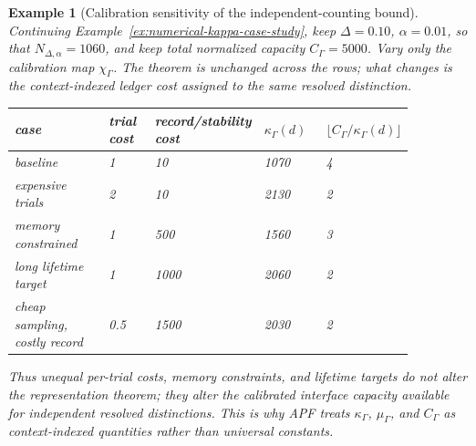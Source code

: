 \documentclass[11pt]{article}
\newtheorem{example}[theorem]{Example}
\begin{document}
\begin{example}[Calibration sensitivity of the independent-counting bound]\label{ex:kappa-sensitivity}
Continuing Example~\ref{ex:numerical-kappa-case-study}, keep \(\Delta=0.10\), \(\alpha=0.01\), so that \(N_{\Delta,\alpha}=1060\), and keep total normalized capacity \(C_\Gamma=5000\).  Vary only the calibration map \(\chi_\Gamma\).  The theorem is unchanged across the rows; what changes is the context-indexed ledger cost assigned to the same resolved distinction.
\begin{center}
\small
\setlength{\tabcolsep}{3pt}
\renewcommand{\arraystretch}{1.15}
\begin{tabular}{@{}p{0.25\linewidth}p{0.12\linewidth}p{0.20\linewidth}p{0.16\linewidth}p{0.14\linewidth}@{}}
\toprule
case & trial cost & record/stability cost & $\kappa_\Gamma(d)$ & $\lfloor C_\Gamma/\kappa_\Gamma(d)\rfloor$\\
\midrule
baseline & 1 & 10 & 1070 & 4\\
expensive trials & 2 & 10 & 2130 & 2\\
memory constrained & 1 & 500 & 1560 & 3\\
long lifetime target & 1 & 1000 & 2060 & 2\\
cheap sampling, costly record & 0.5 & 1500 & 2030 & 2\\
\bottomrule
\end{tabular}
\end{center}
Thus unequal per-trial costs, memory constraints, and lifetime targets do not alter the representation theorem; they alter the calibrated interface capacity available for independent resolved distinctions.  This is why APF treats \(\kappa_\Gamma\), \(\mu_\Gamma\), and \(C_\Gamma\) as context-indexed quantities rather than universal constants.
\end{example}
\end{document}
